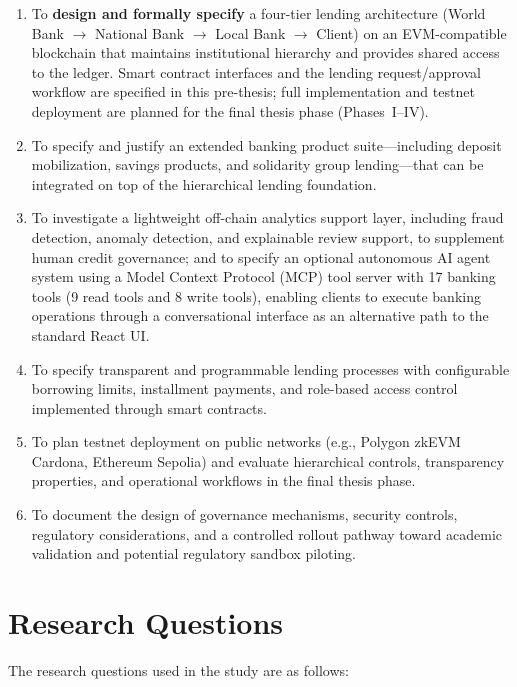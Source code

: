 \documentclass[12pt,a4paper]{report}
\begin{document}
\begin{enumerate}[noitemsep]
\item To \textbf{design and formally specify} a four-tier lending architecture (World Bank $\to$ National Bank $\to$ Local Bank $\to$ Client) on an EVM-compatible blockchain that maintains institutional hierarchy and provides shared access to the ledger. Smart contract interfaces and the lending request/approval workflow are specified in this pre-thesis; full implementation and testnet deployment are planned for the final thesis phase (Phases~I--IV).
\item To specify and justify an extended banking product suite---including deposit mobilization, savings products, and solidarity group lending---that can be integrated on top of the hierarchical lending foundation.
\item To investigate a lightweight off-chain analytics support layer, including fraud detection, anomaly detection, and explainable review support, to supplement human credit governance; and to specify an optional autonomous AI agent system using a Model Context Protocol (MCP) tool server with 17 banking tools (9 read tools and 8 write tools), enabling clients to execute banking operations through a conversational interface as an alternative path to the standard React UI.
\item To specify transparent and programmable lending processes with configurable borrowing limits, installment payments, and role-based access control implemented through smart contracts.
\item To plan testnet deployment on public networks (e.g., Polygon zkEVM Cardona, Ethereum Sepolia) and evaluate hierarchical controls, transparency properties, and operational workflows in the final thesis phase.
\item To document the design of governance mechanisms, security controls, regulatory considerations, and a controlled rollout pathway toward academic validation and potential regulatory sandbox piloting.
\end{enumerate}

\section{Research Questions}

The research questions used in the study are as follows:
\end{document}
